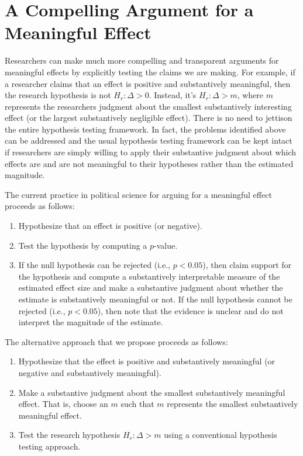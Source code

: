 \documentclass[12pt]{article}
\begin{document}
\section*{A Compelling Argument for a Meaningful Effect}

Researchers can make much more compelling and transparent arguments for meaningful effects by explicitly testing the claims we are making. For example, if  a researcher claims that an effect is positive and substantively meaningful, then the research hypothesis is not $H_r: \Delta > 0$. Instead, it's $H_r: \Delta > m$, where $m$ represents the researchers judgment about the smallest substantively interesting effect (or the largest substantively negligible effect). There is no need to jettison the entire hypothesis testing framework. In fact, the problems identified above can be addressed and the usual hypothesis testing framework can be kept intact if researchers are simply willing to apply their substantive judgment about which effects are and are not meaningful to their hypotheses rather than the estimated magnitude. 

The current practice in political science for arguing for a meaningful effect proceeds as follows:

\singlespace
\begin{enumerate}
\item Hypothesize that an effect is positive (or negative).
\item Test the hypothesis by computing a $p$-value. 
\item If the null hypothesis can be rejected (i.e., $p < 0.05$), then claim support for the hypothesis and compute a substantively interpretable measure of the estimated effect size and make a substantive judgment about whether the estimate is substantively meaningful or not. If the null hypothesis cannot be rejected (i.e., $p < 0.05$), then note that the evidence is unclear and do not interpret the magnitude of the estimate.
\end{enumerate}
\doublespace

The alternative approach that we propose proceeds as follows:
\singlespace
\begin{enumerate}
\item Hypothesize that the effect is positive and substantively meaningful (or negative and substantively meaningful).
\item Make a substantive judgment about the smallest substantively meaningful effect. That is, choose an $m$ such that $m$ represents the smallest substantively meaningful effect.
\item Test the research hypothesis $H_r: \Delta > m$ using a conventional hypothesis testing approach.
\end{enumerate}
\end{document}
